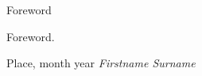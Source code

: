 \begin{chapter}{Foreword}

Foreword.

\begin{flushright}
    Place, month year \hfill \emph{Firstname  Surname}
\end{flushright}

\end{chapter}
